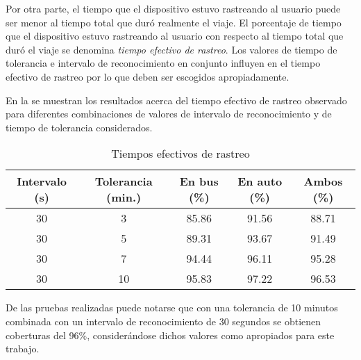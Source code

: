 Por otra parte, el tiempo que el dispositivo estuvo rastreando al usuario puede ser menor al tiempo total que duró realmente el viaje. El porcentaje de tiempo que el dispositivo estuvo rastreando al usuario con respecto al tiempo total que duró el viaje se denomina \emph{tiempo efectivo de rastreo}. Los valores de tiempo de tolerancia e intervalo de reconocimiento en conjunto influyen en el tiempo efectivo de rastreo por lo que deben ser escogidos apropiadamente.

En la  se muestran los resultados acerca del tiempo efectivo de rastreo observado para diferentes combinaciones de valores de intervalo de reconocimiento y de tiempo de tolerancia considerados. 

\begin{table}[h]
    \centering
	\begin{tabular}{ccccc}
    	\toprule
    	Intervalo (s) & Tolerancia (min.) & En bus (\%) & En auto (\%) & Ambos (\%) \\
    	\midrule
    	30            & 3                 & 85.86         & 91.56          & 88.71        \\
    	30            & 5                 & 89.31         & 93.67          & 91.49        \\

    	30            & 7                & 94.44         & 96.11          & 95.28        \\
    	30            & 10                & 95.83         & 97.22          & 96.53        \\
    	\bottomrule
	\end{tabular}
    \caption{Tiempos efectivos de rastreo}
    \label{tab:prom_tiempo_efectivo_rastreo}
\end{table}

De las pruebas realizadas puede notarse que con una tolerancia de 10 minutos combinada con un intervalo de reconocimiento de 30 segundos se obtienen coberturas del 96\%, considerándose dichos valores como apropiados para este trabajo.

